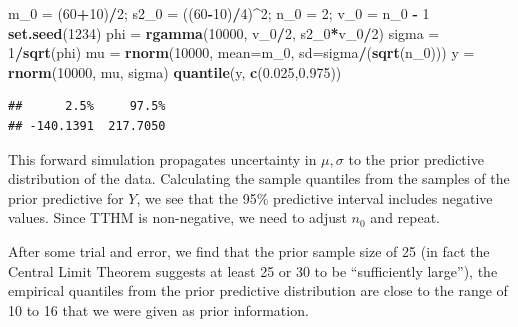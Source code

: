 \documentclass[]{book}
\newenvironment{Shaded}{\begin{snugshade}}{\end{snugshade}}
\newcommand{\KeywordTok}[1]{\textcolor[rgb]{0.13,0.29,0.53}{\textbf{#1}}}
\newcommand{\DataTypeTok}[1]{\textcolor[rgb]{0.13,0.29,0.53}{#1}}
\newcommand{\DecValTok}[1]{\textcolor[rgb]{0.00,0.00,0.81}{#1}}
\newcommand{\FloatTok}[1]{\textcolor[rgb]{0.00,0.00,0.81}{#1}}
\newcommand{\StringTok}[1]{\textcolor[rgb]{0.31,0.60,0.02}{#1}}
\newcommand{\OperatorTok}[1]{\textcolor[rgb]{0.81,0.36,0.00}{\textbf{#1}}}
\newcommand{\NormalTok}[1]{#1}
\theoremstyle{definition}
\theoremstyle{definition}
\theoremstyle{definition}
\theoremstyle{remark}
\begin{document}
\begin{Shaded}
\begin{Highlighting}[]
\NormalTok{m_}\DecValTok{0}\NormalTok{ =}\StringTok{ }\NormalTok{(}\DecValTok{60}\OperatorTok{+}\DecValTok{10}\NormalTok{)}\OperatorTok{/}\DecValTok{2}\NormalTok{; s2_}\DecValTok{0}\NormalTok{ =}\StringTok{ }\NormalTok{((}\DecValTok{60}\OperatorTok{-}\DecValTok{10}\NormalTok{)}\OperatorTok{/}\DecValTok{4}\NormalTok{)}\OperatorTok{^}\DecValTok{2}\NormalTok{;}
\NormalTok{n_}\DecValTok{0}\NormalTok{ =}\StringTok{ }\DecValTok{2}\NormalTok{; v_}\DecValTok{0}\NormalTok{ =}\StringTok{ }\NormalTok{n_}\DecValTok{0} \OperatorTok{-}\StringTok{ }\DecValTok{1}
\KeywordTok{set.seed}\NormalTok{(}\DecValTok{1234}\NormalTok{)}
\NormalTok{phi =}\StringTok{ }\KeywordTok{rgamma}\NormalTok{(}\DecValTok{10000}\NormalTok{, v_}\DecValTok{0}\OperatorTok{/}\DecValTok{2}\NormalTok{, s2_}\DecValTok{0}\OperatorTok{*}\NormalTok{v_}\DecValTok{0}\OperatorTok{/}\DecValTok{2}\NormalTok{)}
\NormalTok{sigma =}\StringTok{ }\DecValTok{1}\OperatorTok{/}\KeywordTok{sqrt}\NormalTok{(phi)}
\NormalTok{mu =}\StringTok{ }\KeywordTok{rnorm}\NormalTok{(}\DecValTok{10000}\NormalTok{, }\DataTypeTok{mean=}\NormalTok{m_}\DecValTok{0}\NormalTok{, }\DataTypeTok{sd=}\NormalTok{sigma}\OperatorTok{/}\NormalTok{(}\KeywordTok{sqrt}\NormalTok{(n_}\DecValTok{0}\NormalTok{)))}
\NormalTok{y =}\StringTok{ }\KeywordTok{rnorm}\NormalTok{(}\DecValTok{10000}\NormalTok{, mu, sigma)}
\KeywordTok{quantile}\NormalTok{(y, }\KeywordTok{c}\NormalTok{(}\FloatTok{0.025}\NormalTok{,}\FloatTok{0.975}\NormalTok{))}
\end{Highlighting}
\end{Shaded}

\begin{verbatim}
##      2.5%     97.5% 
## -140.1391  217.7050
\end{verbatim}

This forward simulation propagates uncertainty in \(\mu,\sigma\) to the
prior predictive distribution of the data. Calculating the sample
quantiles from the samples of the prior predictive for \(Y\), we see
that the 95\% predictive interval includes negative values. Since TTHM
is non-negative, we need to adjust \(n_0\) and repeat.

After some trial and error, we find that the prior sample size of 25 (in
fact the Central Limit Theorem suggests at least 25 or 30 to be
``sufficiently large''), the empirical quantiles from the prior
predictive distribution are close to the range of 10 to 16 that we were
given as prior information.
\end{document}
